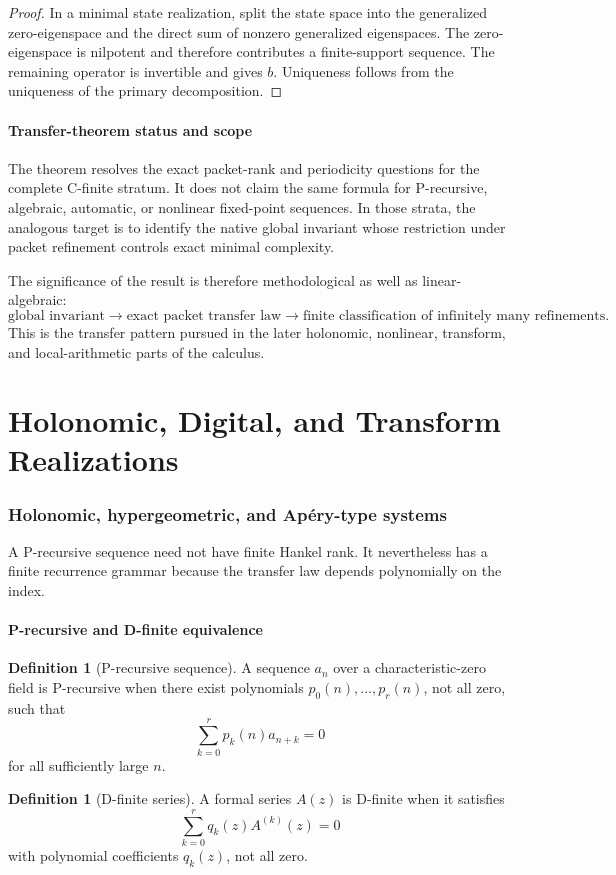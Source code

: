 \documentclass[11pt]{article}
\theoremstyle{definition}\newtheorem{definition}[theorem]{Definition}\newtheorem{example}[theorem]{Example}\newtheorem{construction}[theorem]{Construction}\newtheorem{algorithm}[theorem]{Algorithm}\newtheorem{conjecture}[theorem]{Conjecture}\newtheorem{problem}[theorem]{Problem}
\theoremstyle{remark}\newtheorem{remark}[theorem]{Remark}\newtheorem{boundary}[theorem]{Boundary}\newtheorem{certificate}[theorem]{Computational Certificate}\newtheorem{classical}[theorem]{Classical Input}\newtheorem{principle}[theorem]{Structural Principle}
\begin{document}
\begin{proof}
In a minimal state realization, split the state space into the generalized zero-eigenspace and the direct sum of nonzero generalized eigenspaces.  The zero-eigenspace is nilpotent and therefore contributes a finite-support sequence.  The remaining operator is invertible and gives $b$.  Uniqueness follows from the uniqueness of the primary decomposition.
\end{proof}

\subsection{Transfer-theorem status and scope}
The theorem resolves the exact packet-rank and periodicity questions for the complete C-finite stratum.  It does not claim the same formula for P-recursive, algebraic, automatic, or nonlinear fixed-point sequences.  In those strata, the analogous target is to identify the native global invariant whose restriction under packet refinement controls exact minimal complexity.

The significance of the result is therefore methodological as well as linear-algebraic:
\[
 \boxed{
 \text{global invariant}
 \longrightarrow
 \text{exact packet transfer law}
 \longrightarrow
 \text{finite classification of infinitely many refinements}.
 }
\]
This is the transfer pattern pursued in the later holonomic, nonlinear, transform, and local-arithmetic parts of the calculus.


\part{Holonomic, Digital, and Transform Realizations}
\section{Holonomic, hypergeometric, and Ap\'ery-type systems}

A P-recursive sequence need not have finite Hankel rank.  It nevertheless has a finite recurrence grammar because the transfer law depends polynomially on the index.

\subsection{P-recursive and D-finite equivalence}
\begin{definition}[P-recursive sequence]
A sequence $a_n$ over a characteristic-zero field is P-recursive when there exist polynomials $p_0(n),\ldots,p_r(n)$, not all zero, such that
\[
 \sum_{k=0}^{r}p_k(n)a_{n+k}=0
\]
for all sufficiently large $n$.
\end{definition}
\begin{definition}[D-finite series]
A formal series $A(z)$ is D-finite when it satisfies
\[
 \sum_{k=0}^{r}q_k(z)A^{(k)}(z)=0
\]
with polynomial coefficients $q_k(z)$, not all zero.
\end{definition}
\end{document}
